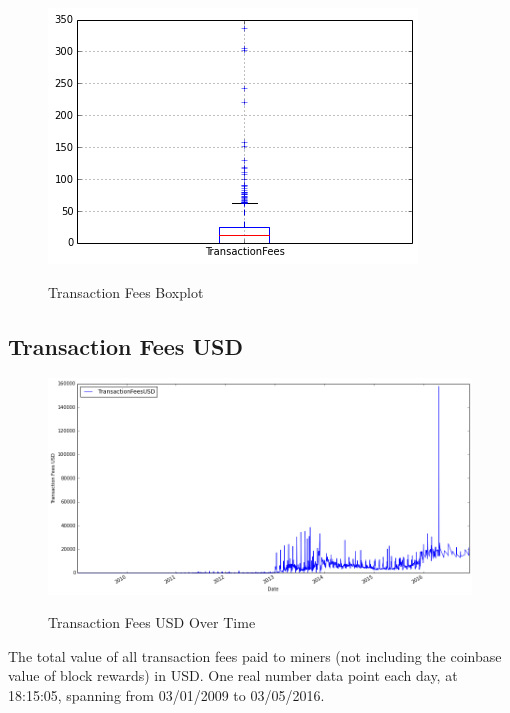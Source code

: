 \begin{figure}[bth]
  \myfloatalign
  {\includegraphics[width=1\linewidth]
    {gfx/transaction-fees-boxplot}}
  \caption{Transaction Fees
    Boxplot}
  \label{fig:transaction-fees-boxplot}
\end{figure}

\clearpage

\subsection{Transaction Fees USD}
\label{sec:transaction-fees-usd}

\begin{figure}[bth]
  \myfloatalign
  {\includegraphics[width=1\linewidth]
    {gfx/transaction-fees-usd-over-time}}
  \caption{Transaction Fees USD
    Over Time}
  \label{fig:transaction-fees-usd-over-time}
\end{figure}

The total value of all transaction fees paid to miners (not including
the coinbase value of block rewards) in USD. One real number data
point each day, at 18:15:05, spanning from 03/01/2009 to 03/05/2016.

